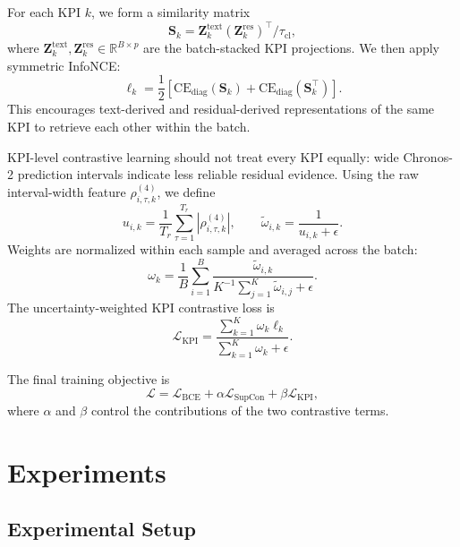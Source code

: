 \documentclass[conference]{IEEEtran}
\begin{document}
For each KPI $k$, we form a similarity matrix
\begin{equation}
\mathbf{S}_k
=
\mathbf{Z}^{\mathrm{text}}_k
(\mathbf{Z}^{\mathrm{res}}_k)^\top
/
\tau_{\mathrm{cl}},
\end{equation}
where $\mathbf{Z}^{\mathrm{text}}_k,\mathbf{Z}^{\mathrm{res}}_k \in \mathbb{R}^{B\times p}$ are the batch-stacked KPI projections. We then apply symmetric InfoNCE:
\begin{equation}
\ell_k
=
\frac{1}{2}
\left[
\mathrm{CE}_{\mathrm{diag}}(\mathbf{S}_k)
+
\mathrm{CE}_{\mathrm{diag}}(\mathbf{S}_k^\top)
\right].
\end{equation}
This encourages text-derived and residual-derived representations of the same KPI to retrieve each other within the batch.

KPI-level contrastive learning should not treat every KPI equally: wide Chronos-2 prediction intervals indicate less reliable residual evidence. Using the raw interval-width feature $\rho^{(4)}_{i,\tau,k}$, we define
\begin{equation}
u_{i,k}
=
\frac{1}{T_r}
\sum_{\tau=1}^{T_r}
|\rho^{(4)}_{i,\tau,k}|,
\qquad
\tilde{\omega}_{i,k}
=
\frac{1}{u_{i,k}+\epsilon}.
\end{equation}
Weights are normalized within each sample and averaged across the batch:
\begin{equation}
\omega_k
=
\frac{1}{B}
\sum_{i=1}^{B}
\frac{
\tilde{\omega}_{i,k}
}{
K^{-1}\sum_{j=1}^{K}\tilde{\omega}_{i,j}+\epsilon
}.
\end{equation}
The uncertainty-weighted KPI contrastive loss is
\begin{equation}
\mathcal{L}_{\mathrm{KPI}}
=
\frac{
\sum_{k=1}^{K}
\omega_k \ell_k
}{
\sum_{k=1}^{K}
\omega_k + \epsilon
}.
\end{equation}

The final training objective is
\begin{equation}
\mathcal{L}
=
\mathcal{L}_{\mathrm{BCE}}
+
\alpha \mathcal{L}_{\mathrm{SupCon}}
+
\beta \mathcal{L}_{\mathrm{KPI}},
\end{equation}
where $\alpha$ and $\beta$ control the contributions of the two contrastive terms.

\section{Experiments}
\label{sec:experiments}

\subsection{Experimental Setup}
\label{sec:setup}
\end{document}
